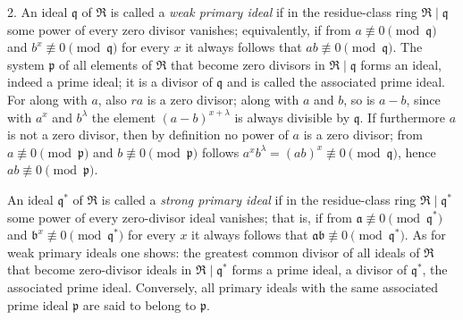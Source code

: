 \documentclass[11pt]{article}
\providecommand{\mR}{\mathfrak{R}}
\providecommand{\ma}{\mathfrak{a}}
\providecommand{\mb}{\mathfrak{b}}
\providecommand{\mpideal}{\mathfrak{p}}
\providecommand{\mq}{\mathfrak{q}}
\begin{document}
2. An ideal $\mq$ of $\mR$ is called a \emph{weak primary ideal} if in the residue-class ring $\mR\mid\mq$ some power of every zero divisor vanishes; equivalently, if from $a\not\equiv0\pmod{\mq}$ and $b^x\not\equiv0\pmod{\mq}$ for every $x$ it always follows that $ab\not\equiv0\pmod{\mq}$. The system $\mpideal$ of all elements of $\mR$ that become zero divisors in $\mR\mid\mq$ forms an ideal, indeed a prime ideal; it is a divisor of $\mq$ and is called the associated prime ideal. For along with $a$, also $ra$ is a zero divisor; along with $a$ and $b$, so is $a-b$, since with $a^x$ and $b^\lambda$ the element $(a-b)^{x+\lambda}$ is always divisible by $\mq$. If furthermore $a$ is not a zero divisor, then by definition no power of $a$ is a zero divisor; from $a\not\equiv0\pmod{\mpideal}$ and $b\not\equiv0\pmod{\mpideal}$ follows $a^x b^\lambda=(ab)^x\not\equiv0\pmod{\mq}$, hence $ab\not\equiv0\pmod{\mpideal}$.

An ideal $\mq^*$ of $\mR$ is called a \emph{strong primary ideal} if in the residue-class ring $\mR\mid\mq^*$ some power of every zero-divisor ideal vanishes; that is, if from $\ma\not\equiv0\pmod{\mq^*}$ and $\mb^x\not\equiv0\pmod{\mq^*}$ for every $x$ it always follows that $\ma\mb\not\equiv0\pmod{\mq^*}$. As for weak primary ideals one shows: the greatest common divisor of all ideals of $\mR$ that become zero-divisor ideals in $\mR\mid\mq^*$ forms a prime ideal, a divisor of $\mq^*$, the associated prime ideal. Conversely, all primary ideals with the same associated prime ideal $\mpideal$ are said to belong to $\mpideal$.
\end{document}
